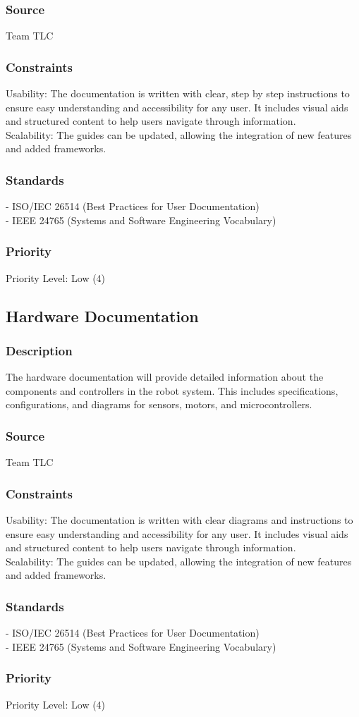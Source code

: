 \subsubsection{Source}
Team TLC

\subsubsection{Constraints}
Usability: The documentation is written with clear, step by step instructions to ensure easy understanding and accessibility for any user.  It includes visual aids and structured content to help users navigate through information. \\
Scalability: The guides can be updated, allowing the integration of new features and added frameworks.

\subsubsection{Standards}
- ISO/IEC 26514 (Best Practices for User Documentation)\\
- IEEE 24765 (Systems and Software Engineering Vocabulary)

\subsubsection{Priority}
Priority Level: Low (4)



\subsection{Hardware Documentation}
\subsubsection{Description}
The hardware documentation will provide detailed information about the components and controllers in the robot system. This includes specifications, configurations, and diagrams for sensors, motors, and microcontrollers.

\subsubsection{Source}
Team TLC

\subsubsection{Constraints}
Usability: The documentation is written with clear diagrams and instructions to ensure easy understanding and accessibility for any user.  It includes visual aids and structured content to help users navigate through information. \\
Scalability: The guides can be updated, allowing the integration of new features and added frameworks.

\subsubsection{Standards}
- ISO/IEC 26514 (Best Practices for User Documentation)\\
- IEEE 24765 (Systems and Software Engineering Vocabulary)

\subsubsection{Priority}
Priority Level: Low (4)

